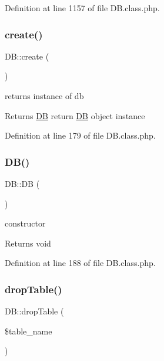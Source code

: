Definition at line 1157 of file D\+B.\+class.\+php.

\mbox{\label{classDB_aad22e845daa75ae9ca9b97f7e3a89749}} 
\subsubsection{\texorpdfstring{create()}{create()}}
{\footnotesize\ttfamily D\+B\+::create (\begin{DoxyParamCaption}{ }\end{DoxyParamCaption})}

returns instance of db \begin{DoxyReturn}{Returns}
\hyperlink{classDB}{DB} return \hyperlink{classDB}{DB} object instance 
\end{DoxyReturn}


Definition at line 179 of file D\+B.\+class.\+php.

\mbox{\label{classDB_a29a603c52c10831cddee82518417f992}} 
\subsubsection{\texorpdfstring{D\+B()}{DB()}}
{\footnotesize\ttfamily D\+B\+::\+DB (\begin{DoxyParamCaption}{ }\end{DoxyParamCaption})}

constructor \begin{DoxyReturn}{Returns}
void 
\end{DoxyReturn}


Definition at line 188 of file D\+B.\+class.\+php.

\mbox{\label{classDB_a63a3a5bdc8e30e1cee37cefddd5ce8de}} 
\subsubsection{\texorpdfstring{drop\+Table()}{dropTable()}}
{\footnotesize\ttfamily D\+B\+::drop\+Table (\begin{DoxyParamCaption}\item[{}]{\$table\+\_\+name }\end{DoxyParamCaption})}

